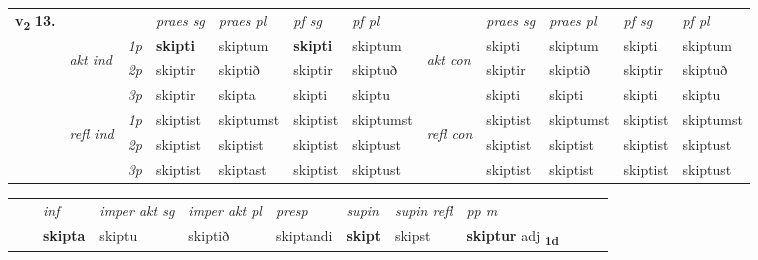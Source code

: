\begin{tabular}{llllllllllll} \toprule
\multirow{4}{*}{{{\textbf{v{\textsubscript{2}}} \Large{\textbf{13.}}}}}  & &   &  \textit{praes sg}  & \textit{praes pl}  &\textit{ pf sg} & \textit{pf pl} &  &  \textit{praes sg}  & \textit{praes pl}  & \textit{pf sg} & \textit{pf pl } \\*
	\cmidrule{4-7} \cmidrule{9-12}
 & \multirow{3}{*}{\begin{turn}{90}\textit{akt ind}\end{turn}} & {\textit{1p}} & \textbf{skipti} & skiptum    & \textbf{skipti} & skiptum & \multirow{3}{*}{\begin{turn}{90}\textit{akt con}\end{turn}} &skipti & skiptum & skipti & skiptum\\*
& &  {\textit{2p}} &  skiptir  & skiptið   & skiptir & skiptuð & & skiptir & skiptið & skiptir & skiptuð \\*
& &  {\textit{3p}} & skiptir & skipta   & skipti & skiptu & & skipti & skipti& skipti & skiptu  \\*
\cmidrule{4-7} \cmidrule{9-12}
 &\multirow{3}{*}{\begin{turn}{90}\textit{refl ind}\end{turn}} & {\textit{1p}} & skiptist & skiptumst    & skiptist & skiptumst & \multirow{3}{*}{\begin{turn}{90}\textit{refl con}\end{turn}}  &skiptist & skiptumst & skiptist & skiptumst\\*
 &&  {\textit{2p}} &  skiptist  & skiptist   & skiptist & skiptust & &skiptist & skiptist & skiptist & skiptust \\*
& &  {\textit{3p}} & skiptist & skiptast   & skiptist & skiptust & & skiptist & skiptist& skiptist & skiptust  \\*
\cmidrule{4-7} \cmidrule{9-12}
\end{tabular}


\begin{tabular}{llllllllllll}
 & & \textit{inf} & \textit{imper akt sg} & \textit{imper akt pl}   & \textit{presp} & \textit{supin} & \textit{supin refl} & \textit{pp m}     \\*
  & & \textbf{skipta} & skiptu  & skiptið   & skiptandi &  \textbf{skipt} & skipst & \textbf{skiptur} adj \textbf{\textsubscript{1d}} \\*
\cmidrule{1-12}
\end{tabular}



